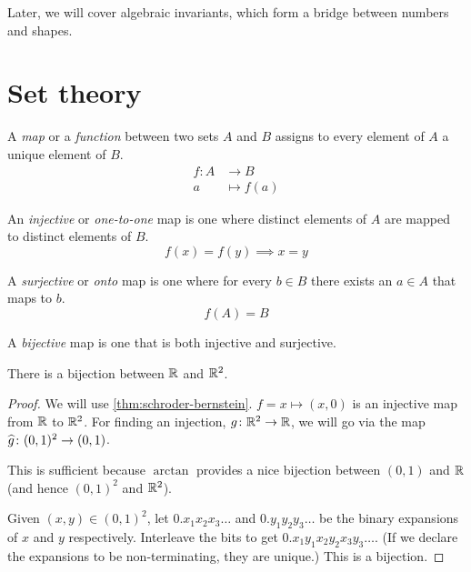 Later, we will cover algebraic invariants, which form a bridge between
numbers and shapes.

\chapter{Set theory} \label{chp:set}
\begin{definition}[Maps] \label{def:maps}
    A \emph{map} or a \emph{function} between two sets $A$ and $B$
    assigns to every element of $A$ a unique element of $B$.
    \begin{align*}
        f\colon A &\to B \\
        a &\mapsto f(a)
    \end{align*}

    An \emph{injective} or \emph{one-to-one} map is one where distinct
    elements of $A$ are mapped to distinct elements of $B$. \[
        f(x) = f(y) \implies x = y
    \]

    A \emph{surjective} or \emph{onto} map is one where for every $b \in B$
    there exists an $a \in A$ that maps to $b$. \[
        f(A) = B
    \]

    A \emph{bijective} map is one that is both injective and surjective.
\end{definition}

\begin{proposition*}
    There is a bijection between $\mathbb{R}$ and $\mathbb{R}^2$.
\end{proposition*}
\begin{proof}
    We will use \cref{thm:schroder-bernstein}.
    $f = x \mapsto (x, 0)$ is an injective map from $\mathbb{R}$ to $\mathbb{R}^2$.
    For finding an injection, $g\colon \mathbb{R}^2 \to \mathbb{R}$, we will go via the
    map $\widehat{g}\colon (0, 1)^2 \to (0, 1)$.

    This is sufficient because $\arctan$ provides a nice bijection
    between $(0, 1)$ and $\mathbb{R}$ (and hence $(0, 1)^2$ and $\mathbb{R}^2$).

    Given $(x, y) \in (0, 1)^2$,
    let $0.x_1x_2x_3\dots$ and $0.y_1y_2y_3\dots$ be the binary
    expansions of $x$ and $y$ respectively.
    Interleave the bits to get $0.x_1y_1x_2y_2x_3y_3\dots$.
    (If we declare the expansions to be non-terminating, they are unique.)
    This is a bijection.
\end{proof}

